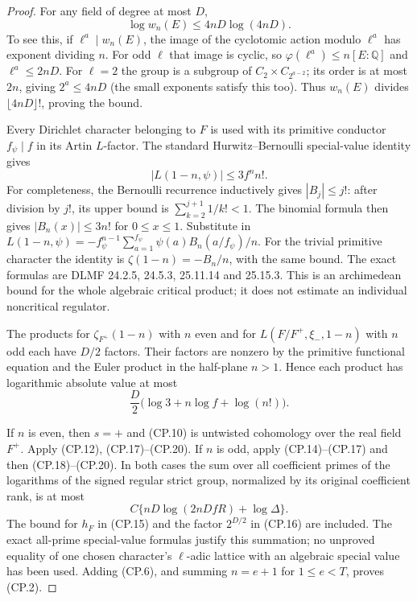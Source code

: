 \begin{proof}
For any field of degree at most $D$,
\[
                         \log w_n(E)\leq4nD\log(4nD).            \tag{CP.18}
\]
To see this, if $\ell^a\mid w_n(E)$, the image of the
cyclotomic action modulo $\ell^a$ has exponent dividing $n$.
For odd $\ell$ that image is cyclic, so
$\varphi(\ell^a)\leq n[E:\mathbb Q]$ and $\ell^a\leq2nD$.
For $\ell=2$ the group is a subgroup of
$C_2\times C_{2^{a-2}}$; its order is at most $2n$, giving
$2^a\leq4nD$ (the small exponents satisfy this too).
Thus $w_n(E)$ divides $\lfloor4nD\rfloor!$, proving the bound.

Every Dirichlet character belonging to $F$ is used with its
primitive conductor $f_\psi\mid f$ in its Artin $L$-factor.
The standard Hurwitz--Bernoulli special-value identity gives
\[
          |L(1-n,\psi)|\leq3 f^n n! .                            \tag{CP.19}
\]
For completeness, the Bernoulli recurrence inductively gives
$|B_j|\leq j!$: after division by $j!$, its upper bound is
$\sum_{k=2}^{j+1}1/k!<1$.  The binomial formula then gives
$|B_n(x)|\leq3n!$ for $0\leq x\leq1$.
Substitute in
$L(1-n,\psi)=-f_\psi^{n-1}\sum_{a=1}^{f_\psi}
\psi(a)B_n(a/f_\psi)/n$.
For the trivial primitive character the identity is
$\zeta(1-n)=-B_n/n$, with the same bound.
The exact formulas are DLMF 24.2.5, 24.5.3,
25.11.14 and 25.15.3.  This is an archimedean bound for
the whole algebraic critical product; it does not estimate
an individual noncritical regulator.

The products for $\zeta_{F^+}(1-n)$ with $n$ even and for
$L(F/F^+,\xi_-,1-n)$ with $n$ odd each have $D/2$ factors.
Their factors are nonzero by the primitive functional equation
and the Euler product in the half-plane $n>1$.
Hence each product has logarithmic absolute value at most
\[
                  \frac D2\bigl(\log3+n\log f+\log(n!)\bigr).
                                                                  \tag{CP.20}
\]

If $n$ is even, then $s=+$ and (CP.10) is untwisted
cohomology over the real field $F^+$.  Apply (CP.12),
(CP.17)--(CP.20).  If $n$ is odd, apply (CP.14)--(CP.17)
and then (CP.18)--(CP.20).  In both cases the sum over all
coefficient primes of the logarithms of the signed regular
strict group, normalized by its original coefficient rank,
is at most
\[
                 C\{nD\log(2nDfR)+\log\Delta\}.                 \tag{CP.21}
\]
The bound for $h_F$ in (CP.15) and the factor $2^{D/2}$ in
(CP.16) are included.  The exact all-prime special-value
formulas justify this summation; no unproved equality of
one chosen character's $\ell$-adic lattice with an algebraic
special value has been used.  Adding (CP.6), and summing
$n=e+1$ for $1\leq e<T$, proves (CP.2).


\end{proof}
